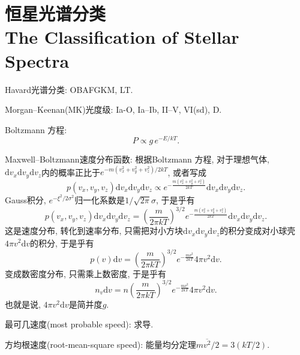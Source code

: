 \chapter{恒星光谱分类\\The Classification of Stellar Spectra}

Havard光谱分类: OBAFGKM, LT.

Morgan--Keenan(MK)光度级: Ia-O, Ia--Ib, II--V, VI(sd), D.

Boltzmann 方程:
\begin{equation*}
    P \propto g\,e^{-E/kT}.
\end{equation*}

Maxwell--Boltzmann速度分布函数: 根据Boltzmann 方程, 对于理想气体, $\mathrm{d}v_x\mathrm{d}v_y\mathrm{d}v_z$内的概率正比于$e^{-m(v_x^2+v_y^2+v_z^2)/2kT}$, 或者写成
\begin{equation*}
    p(v_x,v_y,v_z) \mathrm{d}v_x\mathrm{d}v_y\mathrm{d}v_z \propto e^{-\frac{m(v_x^2+v_y^2+v_z^2)}{2kT}} \mathrm{d}v_x\mathrm{d}v_y\mathrm{d}v_z.
\end{equation*}
Gauss积分, $e^{-\xi^2/2\sigma^2}$归一化系数是$1/\sqrt{2\pi}\sigma$, 于是乎有
\begin{equation*}
    p(v_x,v_y,v_z) \mathrm{d}v_x\mathrm{d}v_y\mathrm{d}v_z = \left(\frac{m}{2\pi kT}\right)^{3/2} e^{-\frac{m(v_x^2+v_y^2+v_z^2)}{2kT}} \mathrm{d}v_x\mathrm{d}v_y\mathrm{d}v_z.
\end{equation*}
这是速度分布, 转化到速率分布, 只需把对小方块$\mathrm{d}v_x\mathrm{d}v_y\mathrm{d}v_z$的积分变成对小球壳$4\pi v^2\mathrm{d}v$的积分, 于是乎有
\begin{equation*}
    p(v) \mathrm{d}v = \left(\frac{m}{2\pi kT}\right)^{3/2} e^{-\frac{mv^2}{2kT}} 4\pi v^2\mathrm{d}v.
\end{equation*}
变成数密度分布, 只需乘上数密度, 于是乎有
\begin{equation*}
    n_v \mathrm{d}v = n \left(\frac{m}{2\pi kT}\right)^{3/2} e^{-\frac{mv^2}{2kT}} 4\pi v^2\mathrm{d}v.
\end{equation*}
也就是说, $4\pi v^2\mathrm{d}v$是简并度$g$.

最可几速度(most probable speed): 求导.

方均根速度(root-mean-square speed): 能量均分定理$m\overline{v^2} /2=3(kT/2)$. 

